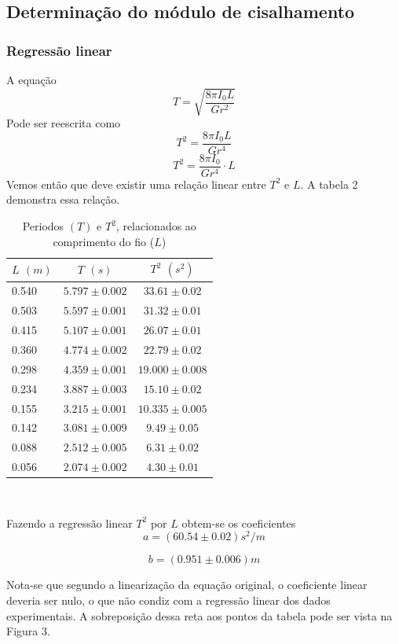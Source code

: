 \documentclass[12pt,a4paper]{article}
\begin{document}
\subsection{Determinação do módulo de cisalhamento}
\subsubsection{Regressão linear}
A equação 
$$ T = \sqrt{\frac{8\pi I_0 L}{G r^2}} $$
Pode ser reescrita como 
$$ T^2 = \frac{8\pi I_0 L}{G r^4} $$
$$ T^2 = \frac{8\pi I_0}{G r^4} \cdot L $$
Vemos então que deve existir uma relação linear entre $T^2$ e $L$. A tabela 2 demonstra essa relação.

\begin{table}[!htbp]
\centering
\def\arraystretch{1.3}
\caption{Periodos $(T)$ e $T^2$, relacionados ao comprimento do fio ($L$)} 
\label{Resultados}
\begin{tabular}{|l|c|c|}
\hline
$L$ $(m)$ & $T$ $(s)$ & $T^2$ $(s^2)$ \\
\hline 
0.540 & $5.797 \pm 0.002$ & $33.61 \pm 0.02 $ \\
\hline 
0.503 & $5.597 \pm 0.001$ & $31.32 \pm 0.01 $ \\
\hline 
0.415 & $5.107 \pm 0.001$ & $26.07 \pm 0.01 $ \\
\hline 
0.360 & $4.774 \pm 0.002$ & $22.79 \pm 0.02 $ \\
\hline
0.298 & $4.359 \pm 0.001$ & $19.000 \pm 0.008 $ \\
\hline
0.234 & $3.887 \pm 0.003$ & $15.10 \pm 0.02 $ \\
\hline
0.155 & $3.215 \pm 0.001$ & $10.335 \pm 0.005 $ \\
\hline 
0.142 & $3.081 \pm 0.009$ & $9.49 \pm 0.05 $ \\
\hline 
0.088 & $2.512 \pm 0.005$ & $6.31 \pm 0.02 $ \\
\hline 
0.056 & $2.074 \pm 0.002$ & $4.30 \pm 0.01 $ \\
\hline 


\end{tabular} \\

\end{table}

Fazendo a regressão linear $T^2$ por $L$ obtem-se os coeficientes
$$ a = (60.54 \pm 0.02) s^2/m $$

$$ b = (0.951 \pm 0.006) m $$

Nota-se que segundo a linearização da equação original, o coeficiente linear deveria ser nulo, o que não condiz com a regressão linear dos dados experimentais. A sobreposição dessa reta aos pontos da tabela pode ser vista na Figura 3.
\end{document}
